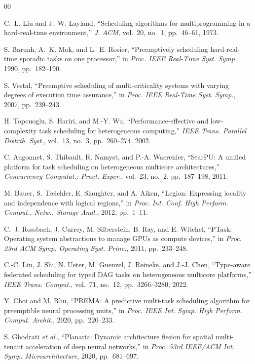 \documentclass[lettersize,journal]{IEEEtran}
\begin{document}
\begin{thebibliography}{00}

C.~L. Liu and J.~W. Layland, ``Scheduling algorithms for multiprogramming in
a hard-real-time environment,'' \emph{J. ACM}, vol.~20, no.~1, pp.~46--61,
1973.

S. Baruah, A.~K. Mok, and L.~E. Rosier, ``Preemptively scheduling
hard-real-time sporadic tasks on one processor,'' in \emph{Proc. IEEE Real-Time
Syst. Symp.}, 1990, pp.~182--190.

S. Vestal, ``Preemptive scheduling of multi-criticality systems with varying
degrees of execution time assurance,'' in \emph{Proc. IEEE Real-Time Syst.
Symp.}, 2007, pp.~239--243.

H. Topcuoglu, S. Hariri, and M.-Y. Wu, ``Performance-effective and
low-complexity task scheduling for heterogeneous computing,'' \emph{IEEE
Trans. Parallel Distrib. Syst.}, vol.~13, no.~3, pp.~260--274, 2002.

C. Augonnet, S. Thibault, R. Namyst, and P.-A. Wacrenier, ``StarPU: A unified
platform for task scheduling on heterogeneous multicore architectures,''
\emph{Concurrency Computat.: Pract. Exper.}, vol.~23, no.~2, pp.~187--198,
2011.

M. Bauer, S. Treichler, E. Slaughter, and A. Aiken, ``Legion: Expressing
locality and independence with logical regions,'' in \emph{Proc. Int. Conf.
High Perform. Comput., Netw., Storage Anal.}, 2012, pp.~1--11.

C.~J. Rossbach, J. Currey, M. Silberstein, B. Ray, and E. Witchel, ``PTask:
Operating system abstractions to manage GPUs as compute devices,'' in
\emph{Proc. 23rd ACM Symp. Operating Syst. Princ.}, 2011, pp.~233--248.

C.-C. Lin, J. Shi, N. Ueter, M. Guenzel, J. Reineke, and J.-J. Chen,
``Type-aware federated scheduling for typed DAG tasks on heterogeneous
multicore platforms,'' \emph{IEEE Trans. Comput.}, vol.~71, no.~12,
pp.~3266--3280, 2022.

Y. Choi and M. Rhu, ``PREMA: A predictive multi-task scheduling algorithm for
preemptible neural processing units,'' in \emph{Proc. IEEE Int. Symp. High
Perform. Comput. Archit.}, 2020, pp.~220--233.

S. Ghodrati \emph{et al.}, ``Planaria: Dynamic architecture fission for
spatial multi-tenant acceleration of deep neural networks,'' in \emph{Proc.
53rd IEEE/ACM Int. Symp. Microarchitecture}, 2020, pp.~681--697.


\end{thebibliography}
\end{document}
